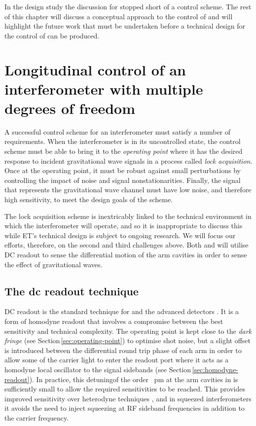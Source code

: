 In the \ET{} design study the discussion for \ETLF{} stopped short of a control scheme. The rest of this chapter will discuss a conceptual approach to the control of \ETLF{} and will highlight the future work that must be undertaken before a technical design for the control of \ETLF{} can be produced.

\section{\label{sec:multi-dof-control}Longitudinal control of an interferometer with multiple degrees of freedom}
A successful control scheme for an interferometer must satisfy a number of requirements. When the interferometer is in its uncontrolled state, the control scheme must be able to bring it to the \emph{operating point} where it has the desired response to incident gravitational wave signals in a process called \emph{lock acquisition}. Once at the operating point, it must be robust against small perturbations by controlling the impact of noise and signal nonstationarities. Finally, the signal that represents the gravitational wave channel must have low noise, and therefore high sensitivity, to meet the design goals of the scheme.

The lock acquisition scheme is inextricably linked to the technical environment in which the interferometer will operate, and so it is inappropriate to discuss this while \gls{ET}'s technical design is subject to ongoing research. We will focus our efforts, therefore, on the second and third challenges above. Both \ETLF{} and \ETHF{} will utilise \gls{DC} readout to sense the differential motion of the arm cavities in order to sense the effect of gravitational waves.

\subsection{The dc readout technique}
\gls{DC} readout is the standard technique for \GEOHF{} and the advanced detectors \cite{Hild2007, Ward2008, Fricke2012}. It is a form of homodyne readout that involves a compromise between the best sensitivity and technical complexity. The operating point is kept close to the \emph{dark fringe} (see Section\,\ref{sec:operating-point}) to optimise shot noise, but a slight offset is introduced between the differential round trip phase of each arm in order to allow some of the carrier light to enter the readout port where it acts as a homodyne local oscillator to the signal sidebands (see Section\,\ref{sec:homodyne-readout}). In practice, this detuning\textemdash of the order \SI{}{\pico\meter} at the arm cavities in \ALIGO{}\textemdash is sufficiently small to allow the required sensitivities to be reached. This provides improved sensitivity over heterodyne techniques \cite{Fricke2012}, and in squeezed interferometers it avoids the need to inject squeezing at \gls{RF} sideband frequencies in addition to the carrier frequency.

